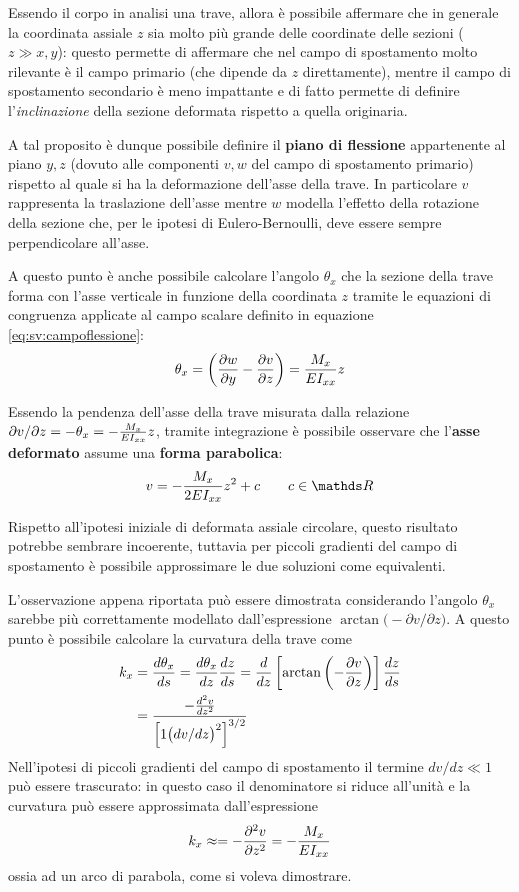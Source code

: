 		Essendo il corpo in analisi una trave, allora è possibile affermare che in generale la coordinata assiale $z$ sia molto più grande delle coordinate delle sezioni ($z\gg x,y$): questo permette di affermare che nel campo di spostamento molto rilevante è il campo primario (che dipende da $z$ direttamente), mentre il campo di spostamento secondario è meno impattante e di fatto permette di definire l'\textit{inclinazione} della sezione deformata rispetto a quella originaria.
		
		A tal proposito è dunque possibile definire il \textbf{piano di flessione} appartenente al piano $y,z$ (dovuto alle componenti $v,w$ del campo di spostamento primario) rispetto al quale si ha la deformazione dell'asse della trave. In particolare $v$ rappresenta la traslazione dell'asse mentre $w$ modella l'effetto della rotazione della sezione che, per le ipotesi di Eulero-Bernoulli, deve essere sempre perpendicolare all'asse.
		
		\vspace{3mm}
		A questo punto è anche possibile calcolare l'angolo $\theta_x$ che la sezione della trave forma con l'asse verticale in funzione della coordinata $z$ tramite le equazioni di congruenza applicate al campo scalare definito in equazione \ref{eq:sv:campoflessione}:
		\[ \theta_x = \left( \frac{\partial w}{\partial y} - \frac{\partial v}{\partial z} \right) = \frac {M_x}{EI_{xx}} z \]
		\begin{concetto}
		    Essendo  la pendenza dell'asse della trave misurata dalla relazione $\partial v / \partial z = -\theta_x = - \frac{M_x}{EI_{xx}} z$, tramite integrazione è possibile osservare che l'\textbf{asse deformato} assume una \textbf{forma parabolica}:
    		\[ v = - \frac{\Mx}{2E\Ixx} z^2 + c \qquad c \in \mathds R \]
		\end{concetto}
		\begin{osservazione}
		    Rispetto all'ipotesi iniziale di deformata assiale circolare, questo risultato potrebbe sembrare incoerente, tuttavia per piccoli gradienti del campo di spostamento è possibile approssimare le due soluzioni come equivalenti.
		\end{osservazione}
		\begin{dimostrazione}
		    L'osservazione appena riportata può essere dimostrata considerando l'angolo $\theta_x$ sarebbe più correttamente modellato dall'espressione $ \arctan \big( - \partial v / \partial z\big)$. A questo punto è possibile calcolare la curvatura della trave come
		    \begin{align*}
		        k_x &=\frac{d\theta_x}{ds} = \frac{d\theta_x}{dz} \frac{dz}{ds} = \frac d {dz} \left[ \arctan \left( - \frac{\partial v}{\partial z} \right)\right] \frac{dz}{ds} \\
		        &= \frac{- \frac{d^2v}{dz^2}}{\Big[ 1 
		         \big(dv/dz\big)^2 \Big]^{3/2}}
		    \end{align*}
		    Nell'ipotesi di piccoli gradienti del campo di spostamento il termine $dv/dz \ll 1$ può essere trascurato: in questo caso il denominatore si riduce all'unità e la curvatura può essere approssimata dall'espressione 
		    \[ k_x \approx = - \frac{\partial ^2v}{\partial z^2} = -\frac{M_x}{EI_{xx}} \]
		    ossia ad un arco di parabola, come si voleva dimostrare.
		\end{dimostrazione}
		
		
		